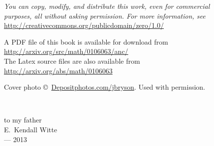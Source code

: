 \begin{center}
\medskip

{\it
You can copy, modify, and distribute this work, even for commercial
\\ purposes, all without asking permission. For more information, see}
	\\ \url{http://creativecommons.org/publicdomain/zero/1.0/}

\bigskip\bigskip

\ifportable \else

A PDF file of this book is available for download from
\\
	\url{http://arxiv.org/src/math/0106063/anc/}
\\[5pt]
The Latex source files are also available from
\\
\url{http://arxiv.org/abs/math/0106063}

\bigskip\bigskip
{\smaller
Cover photo \copyright\ \href{http://Depositphotos.com/portfolio-1987283.html}{Depositphotos.com/jbryson}. Used with permission.} %

\fi %

\end{center}
 




\eject

\thispagestyle{empty}


\ 
\vfil


\begin{center}
 \itshape
\larger

to my father
\\[5pt] E.\ Kendall Witte
\\  --- 2013

\end{center}

 \vfil

\endgroup


